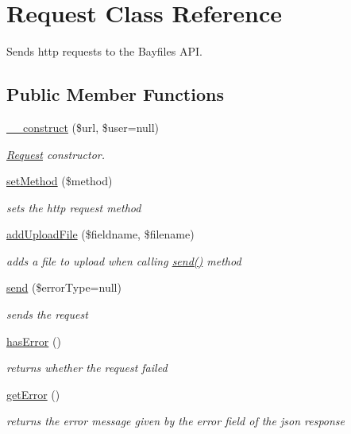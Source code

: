 \hypertarget{classRequest}{
\section{Request Class Reference}
\label{classRequest}
}


Sends http requests to the Bayfiles API.  


\subsection*{Public Member Functions}
\begin{DoxyCompactItemize}
\item 
\hyperlink{classRequest_a7a3dc4998f1b9c696543c112f34965b5}{\_\-\_\-construct} (\$url, \$user=null)
\begin{DoxyCompactList}\small\item\em \hyperlink{classRequest}{Request} constructor. \end{DoxyCompactList}\item 
\hyperlink{classRequest_a432fdb6b9f7a071ef270d7ec938bf74d}{setMethod} (\$method)
\begin{DoxyCompactList}\small\item\em sets the http request method \end{DoxyCompactList}\item 
\hyperlink{classRequest_a9c5afc9327a6343f2522e580cc156882}{addUploadFile} (\$fieldname, \$filename)
\begin{DoxyCompactList}\small\item\em adds a file to upload when calling \hyperlink{classRequest_a9716d01ed89fa00bfb6accd5dea70690}{send()} method \end{DoxyCompactList}\item 
\hyperlink{classRequest_a9716d01ed89fa00bfb6accd5dea70690}{send} (\$errorType=null)
\begin{DoxyCompactList}\small\item\em sends the request \end{DoxyCompactList}\item 
\hyperlink{classRequest_a73eb2c038803d2a08ef20235684d8db7}{hasError} ()
\begin{DoxyCompactList}\small\item\em returns whether the request failed \end{DoxyCompactList}\item 
\hyperlink{classRequest_a293e3cf982bf561bc173dd4da46bf305}{getError} ()
\begin{DoxyCompactList}\small\item\em returns the error message given by the error field of the json response \end{DoxyCompactList}\item 

\end{DoxyCompactItemize}
